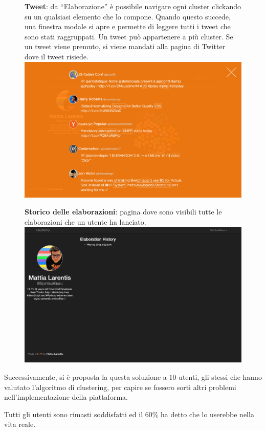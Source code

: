         	\begin{figure}[p]
		\textbf{Tweet}: da ``Elaborazione'' è possibile navigare ogni cluster clickando su un qualsiasi elemento che lo compone. Quando questo succede, una finestra modale si apre e permette di leggere tutti i tweet che sono stati raggruppati. Un tweet può appartenere a più cluster. Se un tweet viene premuto, si viene mandati alla pagina di Twitter dove il tweet risiede.\\

        		\includegraphics[width=\textwidth]{img/clusterify/tweet.png}
        	\end{figure}
        
        	\begin{figure}[p]
		\textbf{Storico delle elaborazioni}: pagina dove sono visibili tutte le elaborazioni che un utente ha lanciato.\\

        		\includegraphics[width=\textwidth]{img/clusterify/history.png}
        	\end{figure}            
	
	\newpage
	Successivamente, si è proposta la questa soluzione a 10 utenti, gli stessi che hanno valutato l'algoritmo di clustering, per capire se fossero sorti altri problemi nell'implementazione della piattaforma. 

	Tutti gli utenti sono rimasti soddisfatti ed il 60\% ha detto che lo userebbe nella vita reale.

